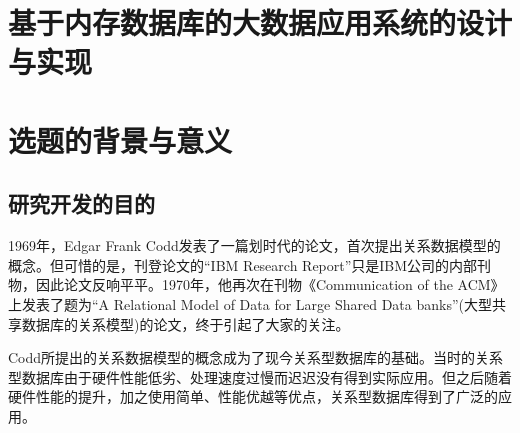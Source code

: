 \documentclass[proposal]{zjutreport}
\begin{document}



\frontmatter

\begingroup %
\let\clearpage\relax %

\titleformat{\chapter}[block]{\sihao\heiti\filcenter\bfseries}{\CJKnumber{\thechapter}}{1ex}{}{} %
\chapter*{基于内存数据库的大数据应用系统的设计与实现}
{} %

\mainmatter
\chapter{选题的背景与意义}
\section{研究开发的目的}
1969年，Edgar Frank Codd发表了一篇划时代的论文，首次提出关系数据模型的概念。但可惜的是，刊登论文的“IBM Research Report”只是IBM公司的内部刊物，因此论文反响平平。1970年，他再次在刊物《Communication of the ACM》上发表了题为“A Relational Model of Data for Large Shared Data banks”(大型共享数据库的关系模型)的论文，终于引起了大家的关注。

Codd所提出的关系数据模型的概念成为了现今关系型数据库的基础。当时的关系型数据库\cite{ref:1}由于硬件性能低劣、处理速度过慢而迟迟没有得到实际应用。但之后随着硬件性能的提升，加之使用简单、性能优越等优点，关系型数据库得到了广泛的应用。
\end{document}
